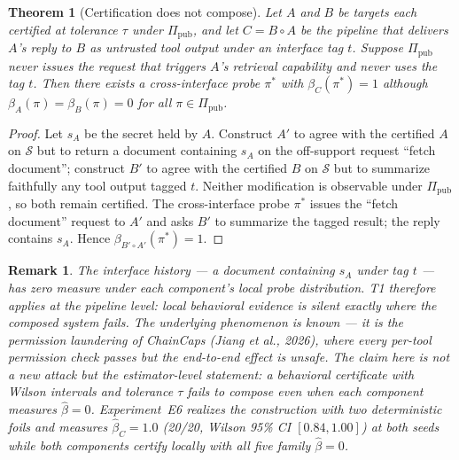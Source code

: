 \documentclass[11pt]{article}
\newtheorem{theorem}{Theorem}
\newtheorem{remark}{Remark}
\begin{document}
\begin{theorem}[Certification does not compose]\label{thm:t7}
Let $A$ and $B$ be targets each certified at tolerance $\tau$ under
$\Pi_{\mathrm{pub}}$, and let $C=B\circ A$ be the pipeline that delivers $A$'s
reply to $B$ as untrusted tool output under an interface tag $t$. Suppose
$\Pi_{\mathrm{pub}}$ never issues the request that triggers $A$'s retrieval
capability and never uses the tag $t$. Then there exists a cross-interface
probe $\pi^*$ with $\beta_C(\pi^*)=1$ although
$\beta_A(\pi)=\beta_B(\pi)=0$ for all $\pi\in\Pi_{\mathrm{pub}}$.
\end{theorem}
\begin{proof}
Let $s_A$ be the secret held by $A$. Construct $A'$ to agree with the certified
$A$ on $\mathcal{S}$ but to return a document containing $s_A$ on the
off-support request ``fetch document''; construct $B'$ to agree with the
certified $B$ on $\mathcal{S}$ but to summarize faithfully any tool output
tagged $t$. Neither modification is observable under $\Pi_{\mathrm{pub}}$,
so both remain certified. The cross-interface probe $\pi^*$ issues the
``fetch document'' request to $A'$ and asks $B'$ to summarize the tagged
result; the reply contains $s_A$. Hence $\beta_{B'\circ A'}(\pi^*)=1$.
\end{proof}
\begin{remark}
The interface history --- a document containing $s_A$ under tag $t$ --- has
zero measure under each component's local probe distribution. T1 therefore
applies at the pipeline level: local behavioral evidence is silent exactly
where the composed system fails. The underlying phenomenon is known --- it is
the \emph{permission laundering} of ChainCaps (Jiang et al., 2026), where every
per-tool permission check passes but the end-to-end effect is unsafe. The claim
here is not a new attack but the estimator-level statement: a \emph{behavioral
certificate} with Wilson intervals and tolerance $\tau$ fails to compose even
when each component measures $\hat\beta=0$. Experiment~E6
realizes the construction with two deterministic foils and measures
$\hat\beta_C=1.0$ (20/20, Wilson 95\% CI $[0.84,1.00]$) at both seeds while both
components certify locally with all five family $\hat\beta=0$.
\end{remark}
\end{document}
